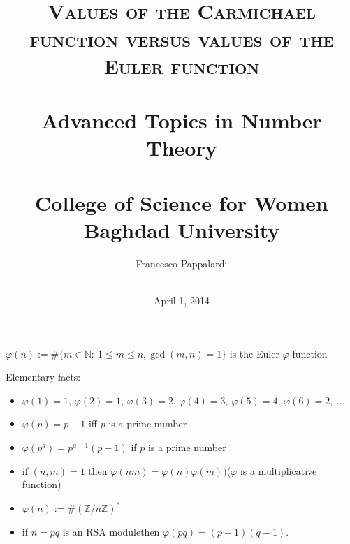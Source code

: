 \documentclass[landscape]{powersem} %
\title{\vspace*{.2cm} \ %
\ \\ \textcolor{underlcolor}{\textsc{Values of the Carmichael
function versus values of the Euler function}} \\ \ \\
Advanced Topics in Number Theory\\
\ \\
College of Science for Women \\
Baghdad University}
\author{\textcolor{Emerald}{Francesco Pappalardi}\\ \ }
\date{\textcolor{BurntOrange}{April 1, 2014}}
\newcommand{\Z}{{\mathbb Z}}
\newcommand{\N}{{\mathbb N}}
\newcommand{\matitablu}{\textcolor{MidnightBlue}{\ding{46}}}
\newcommand{\heading}[1]{%
 \begin{center}
  \large\bf
  \shadowbox{{\textcolor{conceptcolor}{#1}}}%
 \end{center}
 \vspace{1ex minus 1ex}}
\begin{document}
\begin{slide}\pagestyle{empty}
\maketitle
\end{slide}

\begin{slide}
\heading{Introduction: The Euler $\varphi$--function}\pause\vspace{-2mm}
{\Large$\varphi(n):=\#\{m\in\N:\ 1\le m\le n, \gcd(m,n)=1\}$ is the Euler $\varphi$
function}\pause

\noindent\textcolor{BurntOrange}{Elementary facts:}\pause\vspace{-2mm}
\begin{itemize}
\item[\matitablu] $\varphi(1)=1$, $\varphi(2)=1$, $\varphi(3)=2$, $\varphi(4)=3$, $\varphi(5)=4$,
$\varphi(6)=2,\ \ldots$ 
\item[\matitablu] $\varphi(p)=p-1$ \hfill iff $p$ is a prime number\pause
\item[\matitablu] $\varphi(p^a)=p^{a-1}(p-1)$ \hfill if $p$ is a prime number\pause
\item[\matitablu] if $(n,m)=1$ then $\varphi(nm)=\varphi(n)\varphi(m))$\hfill  ($\varphi$ is a multiplicative function)\pause
\item[\matitablu] $\varphi(n):=\#(\Z/n\Z)^*$\pause
\item[\matitablu] if $n=pq$ is an RSA module\quad then $\varphi(pq)=(p-1)(q-1)$.
\end{itemize}
\end{slide}
\end{document}
